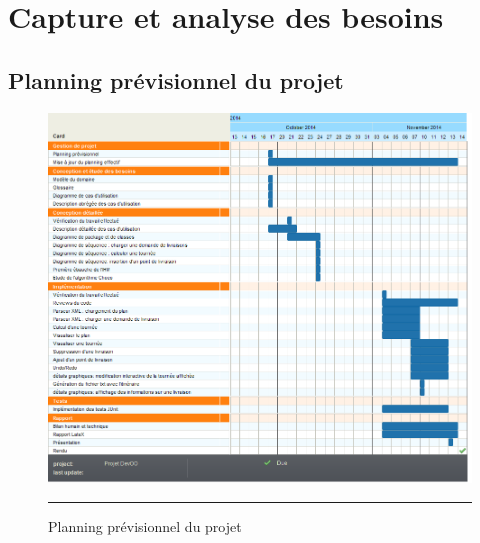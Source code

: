
\chapter{Capture et analyse des besoins} %

\label{Chapter1} %



\section{Planning prévisionnel du projet}
\begin{figure}[htbp]
	\centering
		\includegraphics[width=\textwidth,height=\textheight,keepaspectratio]{Figures/previsional_plan}
		\rule{35em}{0.5pt}
	\caption[Planning prévisionnel]{Planning prévisionnel du projet}
\end{figure}


